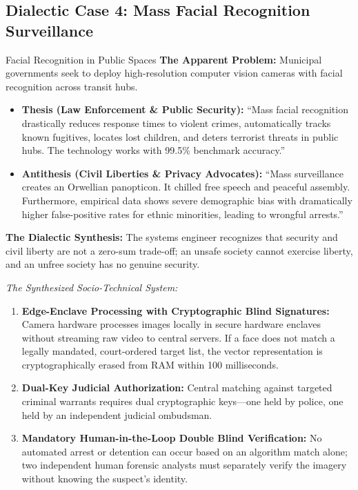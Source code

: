 \subsection{Dialectic Case 4: Mass Facial Recognition Surveillance}
\begin{dialecticbox}{Facial Recognition in Public Spaces}
\textbf{The Apparent Problem:} Municipal governments seek to deploy high-resolution computer vision cameras with facial recognition across transit hubs.

\begin{itemize}[leftmargin=1.5em]
    \item \textbf{Thesis (Law Enforcement \& Public Security):}
    ``Mass facial recognition drastically reduces response times to violent crimes, automatically tracks known fugitives, locates lost children, and deters terrorist threats in public hubs. The technology works with 99.5\% benchmark accuracy.''
    \item \textbf{Antithesis (Civil Liberties \& Privacy Advocates):}
    ``Mass surveillance creates an Orwellian panopticon. It chilled free speech and peaceful assembly. Furthermore, empirical data shows severe demographic bias with dramatically higher false-positive rates for ethnic minorities, leading to wrongful arrests.''
\end{itemize}

\textbf{The Dialectic Synthesis:}
The systems engineer recognizes that security and civil liberty are not a zero-sum trade-off; an unsafe society cannot exercise liberty, and an unfree society has no genuine security.

\textit{The Synthesized Socio-Technical System:}
\begin{enumerate}[leftmargin=1.5em]
    \item \textbf{Edge-Enclave Processing with Cryptographic Blind Signatures:} Camera hardware processes images locally in secure hardware enclaves without streaming raw video to central servers. If a face does not match a legally mandated, court-ordered target list, the vector representation is cryptographically erased from RAM within 100 milliseconds.
    \item \textbf{Dual-Key Judicial Authorization:} Central matching against targeted criminal warrants requires dual cryptographic keys—one held by police, one held by an independent judicial ombudsman.
    \item \textbf{Mandatory Human-in-the-Loop Double Blind Verification:} No automated arrest or detention can occur based on an algorithm match alone; two independent human forensic analysts must separately verify the imagery without knowing the suspect's identity.
\end{enumerate}
\end{dialecticbox}


